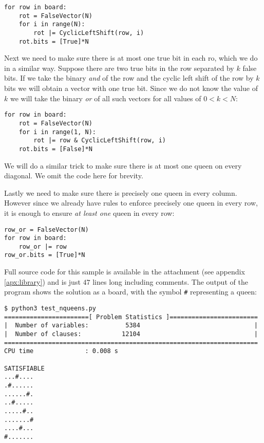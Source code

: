 \begin{verbatim}
for row in board:
    rot = FalseVector(N)
    for i in range(N):
        rot |= CyclicLeftShift(row, i)
    rot.bits = [True]*N
\end{verbatim}

Next we need to make sure there is at most one true bit in each ro, which we do in a similar way.
Suppose there are two true bits in the row separated by $k$ false bits.
If we take the binary \emph{and} of the row and the cyclic left shift of the row by $k$ bits we will obtain a vector with one true bit.
Since we do not know the value of $k$ we will take the binary \emph{or} of all such vectors for all values of $0 < k < N$:

\begin{verbatim}
for row in board:
    rot = FalseVector(N)
    for i in range(1, N):
        rot |= row & CyclicLeftShift(row, i)
    rot.bits = [False]*N
\end{verbatim}

We will do a similar trick to make sure there is at most one queen on every diagonal.
We omit the code here for brevity.

Lastly we need to make sure there is precisely one queen in every column.
However since we already have rules to enforce precisely one queen in every row, it is enough to ensure \emph{at least one} queen in every row:

\begin{verbatim}
row_or = FalseVector(N)
for row in board:
    row_or |= row
row_or.bits = [True]*N
\end{verbatim}

Full source code for this sample is available in the attachment (see appendix \ref{apx:library}) and is just $47$ lines long including comments.
The output of the program shows the solution as a board, with the symbol \texttt{\#} representing a queen:

\begin{Verbatim}
$ python3 test_nqueens.py
=======================[ Problem Statistics ]========================
|  Number of variables:          5384                               |
|  Number of clauses:           12104                               |
=====================================================================
CPU time              : 0.008 s

SATISFIABLE
...#....
.#......
......#.
..#.....
.....#..
.......#
....#...
#.......
\end{Verbatim}

